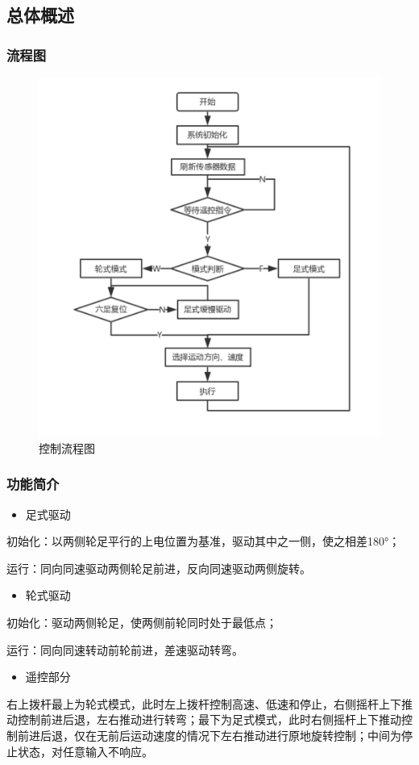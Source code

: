 \documentclass[12pt]{article}
\begin{document}
\begin{CJK}{UTF8}{gbsn}
\subsection{总体概述}
\subsubsection{流程图}
 \begin{figure}[H]
\centering
\includegraphics[width=.8\textwidth]{chap5//fig1.jpg}
\caption{控制流程图}
\end{figure}
\subsubsection{功能简介}
\begin{itemize}
\item 足式驱动
\end{itemize}\par
初始化：以两侧轮足平行的上电位置为基准，驱动其中之一侧，使之相差180°；\par
运行：同向同速驱动两侧轮足前进，反向同速驱动两侧旋转。
\begin{itemize}
\item 轮式驱动
\end{itemize}\par
初始化：驱动两侧轮足，使两侧前轮同时处于最低点；\par
运行：同向同速转动前轮前进，差速驱动转弯。

\begin{itemize}
\item 遥控部分
\end{itemize}\par
右上拨杆最上为轮式模式，此时左上拨杆控制高速、低速和停止，右侧摇杆上下推动控制前进后退，左右推动进行转弯；最下为足式模式，此时右侧摇杆上下推动控制前进后退，仅在无前后运动速度的情况下左右推动进行原地旋转控制；中间为停止状态，对任意输入不响应。

\end{CJK}
\end{document}
